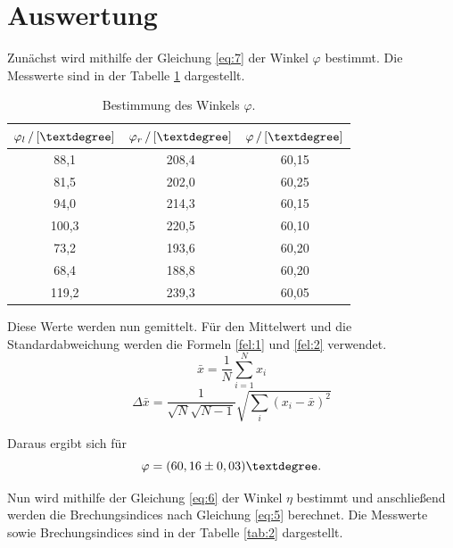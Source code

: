 \section{Auswertung}
Zunächst wird mithilfe der Gleichung \ref{eq:7} der Winkel $\varphi$ bestimmt.
Die Messwerte sind in der Tabelle \ref{tab:1} dargestellt.
\begin{table}[H]
  \centering
  \caption{Bestimmung des Winkels $\varphi$.}
  \label{tab:1}
  \begin{tabular}{c c c}
    \toprule
    $\varphi_l\,/\,[\textdegree]$ & $\varphi_r\,/\,[\textdegree]$ & $\varphi \,/\,[\textdegree]$\\
    \midrule
    88,1 &208,4 &60,15\\
    81,5 &202,0 &60,25\\
    94,0 &214,3 &60,15\\
    100,3& 220,5& 60,10\\
    73,2 &193,6 &60,20\\
    68,4 &188,8 &60,20\\
    119,2& 239,3& 60,05\\
    \bottomrule
  \end{tabular}
\end{table}
Diese Werte werden nun gemittelt.
Für den Mittelwert und die Standardabweichung werden die Formeln \ref{fel:1} und \ref{fel:2} verwendet.
\begin{equation}
    \bar{x} = \frac{1}{N} \sum_{i=1}^{N} x_i
    \label{fel:1}
\end{equation}
\begin{equation}
  \Delta \bar{x} = \frac{1}{\sqrt{N}\sqrt{N-1}} \sqrt{\sum_{i}(x_i-\bar{x})^2}
  \label{fel:2}
\end{equation}

Daraus ergibt sich für
\begin{equation*}
  \varphi = (60,16\pm0,03)\textdegree.
\end{equation*}

Nun wird mithilfe der Gleichung \ref{eq:6} der Winkel $\eta$ bestimmt und anschließend werden
die Brechungsindices nach Gleichung \ref{eq:5} berechnet.
Die Messwerte sowie Brechungsindices sind in der Tabelle \ref{tab:2} dargestellt.

